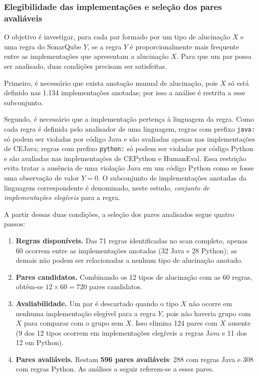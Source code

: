 \subsubsection{Elegibilidade das implementações e seleção dos pares avaliáveis}\label{sec:elegibilidade}

O objetivo é investigar, para cada par formado por um tipo de alucinação $X$ e uma regra do SonarQube $Y$, se a regra $Y$ é proporcionalmente mais frequente entre as implementações que apresentam a alucinação $X$. Para que um par possa ser analisado, duas condições precisam ser satisfeitas.

Primeiro, é necessário que exista anotação manual de alucinação, pois $X$ só está definido nas 1.134 implementações anotadas; por isso a análise é restrita a esse subconjunto.

Segundo, é necessário que a implementação pertença à linguagem da regra. Como cada regra é definida pelo analisador de uma linguagem, regras com prefixo \texttt{java:} só podem ser violadas por código Java e são avaliadas apenas nas implementações de CEJava; regras com prefixo \texttt{python:} só podem ser violadas por código Python e são avaliadas nas implementações de CEPython e HumanEval. Essa restrição evita tratar a ausência de uma violação Java em um código Python como se fosse uma observação de valor $Y=0$. O subconjunto de implementações anotadas da linguagem correspondente é denominado, neste estudo, \textit{conjunto de implementações elegíveis} para a regra.

A partir dessas duas condições, a seleção dos pares analisados segue quatro passos:

\begin{enumerate}
    \item \textbf{Regras disponíveis.} Das 71 regras identificadas no scan completo, apenas 60 ocorrem entre as implementações anotadas (32 Java e 28 Python); as demais não podem ser relacionadas a nenhum tipo de alucinação anotado.
    \item \textbf{Pares candidatos.} Combinando os 12 tipos de alucinação com as 60 regras, obtêm-se $12 \times 60 = 720$ pares candidatos.
    \item \textbf{Avaliabilidade.} Um par é descartado quando o tipo $X$ não ocorre em nenhuma implementação elegível para a regra $Y$, pois não haveria grupo com $X$ para comparar com o grupo sem $X$. Isso elimina 124 pares com $X$ ausente (9 dos 12 tipos ocorrem em implementações elegíveis a regras Java e 11 dos 12 em Python).
    \item \textbf{Pares avaliáveis.} Restam \textbf{596 pares avaliáveis}: 288 com regras Java e 308 com regras Python. As análises a seguir referem-se a esses pares.
\end{enumerate}

